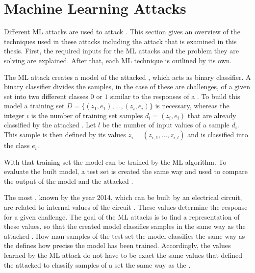 \chapter{Machine Learning Attacks}
\label{cap:mla}

Different \ac{ML} attacks are used to attack \pufs.
This section gives an overview of the techniques used in these attacks including the attack that is examined in this thesis. %
First, the required inputs for the \ac{ML} attacks and the problem they are solving are explained.
After that, each \ac{ML} technique is outlined by its own.

The \ac{ML} attack creates a \puf model of the attacked \puf, which acts as binary classifier.
A binary classifier divides the samples, in the case of \pufs these are challenges, of a given set into two different classes $0$ or $1$ similar to the responses of a \puf. %
To build this model a training set $D = \{(z_1, e_1), ..., (z_i,e_i)\}$ is necessary, whereas the integer $i$ is the number of training set samples $d_i = (z_i, e_i)$ that are already classified by the attacked \puf.
Let $l$ be the number of input values of a sample $d_i$.
This sample is then defined by its values $z_i = (z_{i,1}, ...,z_{i,l})$ and is classified into the class $e_i$. 

With that training set the model can be trained by the \ac{ML} algorithm.
To evaluate the built model, a test set is created the same way and used to compare the output of the \puf model and the attacked \puf.

The most \pufs, known by the year 2014, which can be built by an electrical circuit, are related to internal values of the circuit \cite{Ruhrmair2014PUFOverview}.
These values determine the response for a given challenge. %
The goal of the \ac{ML} attacks is to find a representation of these values, so that the created model classifies samples in the same way as the attacked \puf. %
How man samples of the test set the model classifies the same way as the \puf defines how precise the model has been trained. %
Accordingly, the values learned by the \ac{ML} attack do not have to be exact the same values that defined the attacked \puf to classify samples of a set the same way as the \puf.

